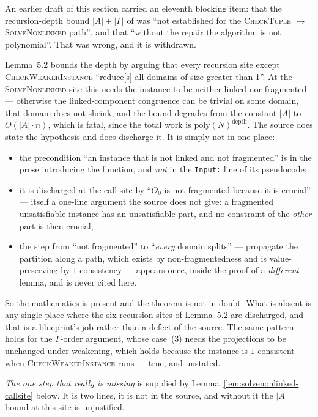 \begin{remark}\label{rem:d10-retracted}
An earlier draft of this section carried an eleventh blocking item: that the
recursion-depth bound $|A|+|\Gamma|$ of \cite[Lem.~5.2]{ZhukJACM} was ``not
established for the \textsc{CheckTuple} $\to$ \textsc{SolveNonlinked} path'',
and that ``without the repair the algorithm is not polynomial''. That was
wrong, and it is withdrawn.

Lemma~5.2 bounds the depth by arguing that every recursion site except
\textsc{CheckWeakerInstance} ``reduce[s] all domains of size greater than 1''.
At the \textsc{SolveNonlinked} site this needs the instance to be neither
linked nor fragmented --- otherwise the linked-component congruence can be
trivial on some domain, that domain does not shrink, and the bound degrades
from the constant $|A|$ to $O(|A|\cdot n)$, which is fatal, since the total work
is $\mathrm{poly}(N)^{\text{depth}}$. The source does state the hypothesis and
does discharge it. It is simply not in one place:
\begin{itemize}\tightlist
\item the precondition ``an instance that is not linked and not fragmented''
  is in the prose introducing the function, and \emph{not} in the
  \texttt{Input:} line of its pseudocode;
\item it is discharged at the call site by ``$\Theta_{0}$ is not fragmented
  because it is crucial'' --- itself a one-line argument the source does not
  give: a fragmented unsatisfiable instance has an unsatisfiable part, and no
  constraint of the \emph{other} part is then crucial;
\item the step from ``not fragmented'' to ``\emph{every} domain splits'' ---
  propagate the partition along a path, which exists by non-fragmentedness and
  is value-preserving by $1$-consistency --- appears once, inside the proof of a
  \emph{different} lemma, and is never cited here.
\end{itemize}
So the mathematics is present and the theorem is not in doubt. What is absent is
any single place where the six recursion sites of Lemma~5.2 are discharged, and
that is a blueprint's job rather than a defect of the source. The same pattern
holds for the $\Gamma$-order argument, whose case~(3) needs the projections to
be unchanged under weakening, which holds because the instance is
$1$-consistent when \textsc{CheckWeakerInstance} runs --- true, and unstated.

\emph{The one step that really is missing} is supplied by
Lemma~\ref{lem:solvenonlinked-callsite} below. It is two lines, it is not in
the source, and without it the $|A|$ bound at this site is unjustified.
\end{remark}

